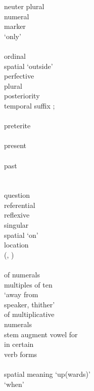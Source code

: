 \begin{multicols}{2}
\begin{tabbing}
				\>	neuter plural\\
				\>	numeral\\
				\>	 marker\\
				\>	 `only'\\
				\>	\\
				\>	ordinal\\
				\>	spatial  `outside'\\
				\>	perfective\\
				\>	plural\\
				\>	posteriority \\
			{}		\>	    temporal suffix ;\\
			{}		\>	      \\
				\>	preterite\\
				\>	\\
				\>	present\\
				\>	\\
				\>	past\\
				\>	\\
				\>	\\
					\>	question\\
				\>	referential\\
				\>	reflexive\\
				\>	singular\\
				\>	spatial  `on'\\
				\>	location \\
			{}		\>	(, )\\
				\>	\\
				\>	 of numerals \\ \> multiples of ten\\
				\>	 `away from \\ \> speaker, thither'\\
				\>	 of multiplicative \\ \> numerals\\
				\>	stem augment vowel for \\ \>  in certain \\ \> verb forms\\
				\>	\\
				\>	spatial meaning `up(wards)'\\
				\>	 `when'
		\end{tabbing}
	\end{multicols}

